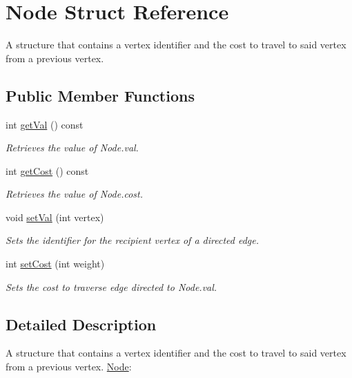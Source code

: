 \hypertarget{structNode}{
\section{Node Struct Reference}
\label{structNode}
}


A structure that contains a vertex identifier and the cost to travel to said vertex from a previous vertex.  
\subsection*{Public Member Functions}
\begin{DoxyCompactItemize}
\item 
int \hyperlink{structNode_a957988714d1379c48c42a78d28c3e76f}{getVal} () const 
\begin{DoxyCompactList}\small\item\em Retrieves the value of Node.val. \item\end{DoxyCompactList}\item 
int \hyperlink{structNode_a91e4e810ff0506963c534a09b7caaab3}{getCost} () const 
\begin{DoxyCompactList}\small\item\em Retrieves the value of Node.cost. \item\end{DoxyCompactList}\item 
void \hyperlink{structNode_ad2e319a35d03a16c1e8475025ebe3053}{setVal} (int vertex)
\begin{DoxyCompactList}\small\item\em Sets the identifier for the recipient vertex of a directed edge. \item\end{DoxyCompactList}\item 
int \hyperlink{structNode_a7463c53f33afec1d2b9535f8b0f26ef1}{setCost} (int weight)
\begin{DoxyCompactList}\small\item\em Sets the cost to traverse edge directed to Node.val. \item\end{DoxyCompactList}\end{DoxyCompactItemize}


\subsection{Detailed Description}
A structure that contains a vertex identifier and the cost to travel to said vertex from a previous vertex. \hyperlink{structNode}{Node}: 


